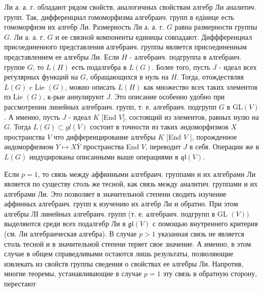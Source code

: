 \documentclass[10pt]{article}
\begin{document}
Ли а. а. г. обладают рядом свойств, аналогичных свойствам алгебр Ли аналитич. групп. Так, дифференциал гомоморфизма алгебраич. групп в едінице есть гомоморфизм их алгебр Ли. Размерность Ли а. а. г. $G$ равна размерности группы $G$. Ли а. а. г. $G$ и ее связной компоненты единицы совпадают. Диффференциал присоединенного представления алгебраич. группы является присоединенным представлением ее алгебры Ли. Если $H$ - алгебраич. подгруппа в алгебраич. группе $G$, то $L(H)$ есть подалгебра в $L(G)$. Более того, пусть $J$ - идеал всех регулярных функций на $G$, обращающихся в нуль на $H$. Тогда, отождествляя $L(G)$ c Lie $(G)$, можно описать $L(H)$ как множество всех таких элементов пз Lie $(G)$, к-рые аннулируют $J$. Это описание особенно удобно при рассмотрении линейных алгебраич. групп, т. е. алгебраич. подгрупп $G$ в $\mathrm{GL}(V)$. А именно, пусть $J$ - идеал $K$ [End $V]$, состоящий из элементов, равных нулю на $G$. Тогда $L(G) \subset g l(V)$ состоит в точности из таких әндоморфизмов $X$ пространства $V$ что дифференцирование алгебры $K$ [End $V$ ], порожденное әндоморфизмом $Y \mapsto X \bar{Y}$ пространства End $V$, переводит $J$ в себя. Операции же в $L(G)$ индуцированы описанными выше операциями в $\mathfrak{q l}(V)$.



Если $p=1$, то связь между аффинными алгебраич. группами и их алгебрами Ли является по существу столь же тесной, как связь между аналитич. группами и их алгебрами Ли. Это позволяет в значительной степени сводить изучение аффинных алгебраич. групп к изучению их алгебр Ли и обратно. При этом алгебры ЛІ линейных алгебраич. групп (т. е. алгебраич. подгрупп в GL $(V))$ выделяются среди всех подалгебр Ли в $\mathfrak{g l}(V)$ с помощью внутреннего критерия (см. Ли алгебраическая алгебра). В случае $p>1$ указанная связь не является столь тесной и в значительной степени теряет свое значение. А именно, в этом случае в общем справедливыми остаются лишь результаты, позволяющие извлекать из свойств группы сведения о свойствах ее алгебры Ли. Напротив, многие теоремы, устанавливающие в случае $p=1$ эту связь в обратную сторону, перестают
\end{document}
